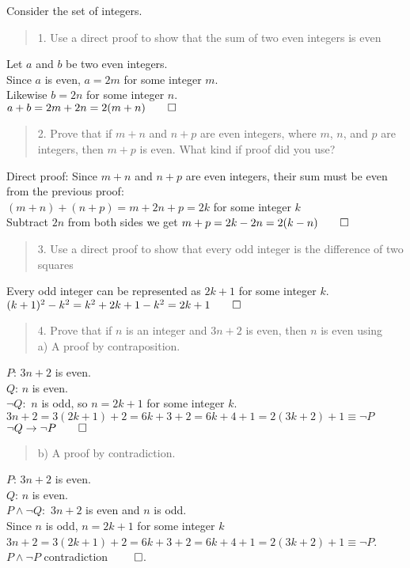 \documentclass[12pt]{article}
\newenvironment{problem}[2][Problem]{\begin{trivlist}
\item[\hskip \labelsep {\bfseries #1}\hskip \labelsep {\bfseries #2.}]}{\end{trivlist}}
\begin{document}
\begin{problem}{2}
Consider the set of integers. 
\begin{quote}
    1. Use a direct proof to show that the sum of two even integers is even
\end{quote}
Let $a$ and $b$ be two even integers.\\
Since $a$ is even, $a = 2m$ for some integer $m$.\\
Likewise $b = 2n$ for some integer $n$.\\
$a + b = 2m + 2n = 2(m+n) \qed$
\begin{quote}
    2. Prove that if $m + n$ and $n + p$ are even integers, where $m$, $n$, and $p$ are integers, then $m + p$
is even. What kind if proof did you use?
\end{quote}
Direct proof:
Since $m + n$ and $n + p$ are even integers, their sum must be even from the previous proof:\\
$(m + n) + (n + p) = m + 2n + p = 2k$ for some integer $k$\\
Subtract $2n$ from both sides we get $m + p = 2k - 2n = 2(k-n)\qed$
\pagebreak
\begin{quote}
    3. Use a direct proof to show that every odd integer is the difference of two squares
\end{quote}
Every odd integer can be represented as $2k + 1$ for some integer $k$.\\
$(k + 1)^2 - k^2 = k^2 + 2k + 1 - k^2 = 2k + 1 \qed$

\begin{quote}
    4. Prove that if $n$ is an integer and $3n + 2$ is even, then $n$ is even using\\
    a) A proof by contraposition.
\end{quote}
$P$: $3n + 2$ is even.\\
$Q$: $n$ is even.\\
$\neg Q:$ $n$ is odd, so $n = 2k + 1$ for some integer $k$.\\
$3n + 2 = 3(2k + 1) + 2 = 6k + 3 + 2 = 6k + 4 + 1 = 2(3k + 2) + 1 \equiv \neg P$ \\
$\neg Q \rightarrow \neg P \qed$
\begin{quote}
    b) A proof by contradiction.
\end{quote}
$P$: $3n + 2$ is even.\\
$Q$: $n$ is even.\\
$P \land \neg Q:$ $3n + 2$ is even and $n$ is odd.\\
Since $n$ is odd, $n = 2k+1$ for some integer $k$\\
$3n + 2 = 3(2k + 1) + 2 = 6k + 3 + 2 = 6k + 4 + 1 = 2(3k + 2) + 1 \equiv \neg P$.\\
$P \land \neg P$ contradiction $\qed$.


\end{problem}
\end{document}
